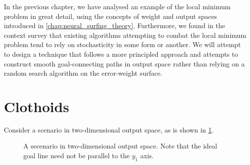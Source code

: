 In the previous chapter, we have analysed an example of the local minimum problem in great detail, using the concepts of weight and output spaces introduced in \ref{chap:neural_surfing_theory}.
Furthermore, we found in the context survey that existing algorithms attempting to combat the local minimum problem tend to rely on stochasticity in some form or another.
We will attempt to design a technique that follows a more principled approach and attempts to construct smooth goal-connecting paths in output space rather than relying on a random search algorithm on the error-weight surface.

\section{Clothoids}
\label{sec:clothoids}
Consider a scenario in two-dimensional output space, as is shown in \ref{fig:clothoid_motivation_scenario}.
\begin{figure}
    \centering
    \caption{A secenario in two-dimensional output space. Note that the ideal goal line need not be parallel to the $y_1$ axis.}
    \label{fig:clothoid_motivation_scenario}
\end{figure}
